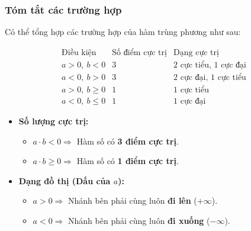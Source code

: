 \begin{itemize}
\begin{center}
\end{center}

\subsubsection{Tóm tắt các trường hợp}

Có thể tổng hợp các trường hợp của hàm trùng phương như sau:

\[
\begin{array}{c|c|c}
\text{Điều kiện} & \text{Số điểm cực trị}
& \text{Dạng cực trị}\\
\hline
a>0,\ b<0 & 3 & 2\text{ cực tiểu, }1\text{ cực đại}\\
a<0,\ b>0 & 3 & 2\text{ cực đại, }1\text{ cực tiểu}\\
a>0,\ b\geq0 & 1 & 1\text{ cực tiểu}\\
a<0,\ b\leq0 & 1 & 1\text{ cực đại}
\end{array}
\]
\vspace{0.5cm}
\begin{center}
\begin{tcolorbox}[colback=blue!5!white,colframe=blue!75!black,title=\textbf{Mẹo nhớ nhanh}]
\begin{itemize}
    \item \textbf{Số lượng cực trị:}
    \begin{itemize}
        \item $a \cdot b < 0 \Rightarrow$ Hàm số có \textbf{3 điểm cực trị}.
        \item $a \cdot b \ge 0 \Rightarrow$ Hàm số có \textbf{1 điểm cực trị}.
    \end{itemize}
    \item \textbf{Dạng đồ thị (Dấu của $a$):}
    \begin{itemize}
        \item $a > 0 \Rightarrow$ Nhánh bên phải cùng luôn \textbf{đi lên} ($+\infty$).
        \item $a < 0 \Rightarrow$ Nhánh bên phải cùng luôn \textbf{đi xuống} ($-\infty$).
    \end{itemize}
\end{itemize}
\end{tcolorbox}
\end{center}

\end{itemize}
